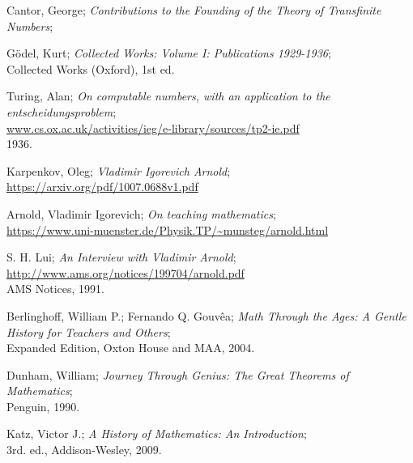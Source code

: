 \documentclass[a4paper,11pt]{article}
\begin{document}
\begin{thebibliography}{99}

\bibitem{}
Cantor, George; \emph{Contributions to the Founding of the Theory of Transfinite Numbers};

\bibitem{}
Gödel, Kurt; \emph{Collected Works: Volume I: Publications 1929-1936};\\
Collected Works (Oxford), 1st ed.

\bibitem{}
Turing, Alan; \emph{On computable numbers, with an application to the entscheidungsproblem};\\
\url{www.cs.ox.ac.uk/activities/ieg/e-library/sources/tp2-ie.pdf}\\
1936.

\bibitem{}
Karpenkov, Oleg; \emph{Vladimir Igorevich Arnold};\\
\url{https://arxiv.org/pdf/1007.0688v1.pdf}

\bibitem{}
Arnold, Vladimir Igorevich; \emph{On teaching mathematics};\\
\url{https://www.uni-muenster.de/Physik.TP/~munsteg/arnold.html}

\bibitem{}
S. H. Lui; \emph{An Interview with Vladimir Arnold};\\
\url{http://www.ams.org/notices/199704/arnold.pdf}\\
AMS Notices, 1991.

\bibitem{}
Berlinghoff, William P.; Fernando Q. Gouvêa; \emph{Math Through the Ages: A Gentle History for Teachers and Others};\\
Expanded Edition, Oxton House and MAA, 2004. 

\bibitem{}
Dunham, William; \emph{Journey Through Genius: The Great Theorems of Mathematics};\\
Penguin, 1990. 

\bibitem{}
Katz, Victor J.; \emph{A History of Mathematics: An Introduction};\\
3rd. ed., Addison-Wesley, 2009.


\end{thebibliography}
\end{document}
